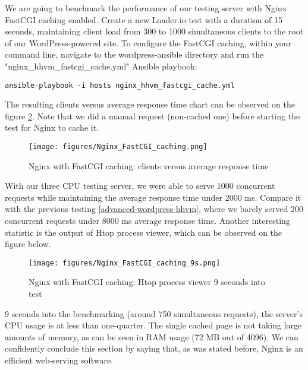We are going to benchmark the performance of our testing server with Nginx FastCGI caching enabled. Create a new Loader.io test with a duration of 15 seconds, maintaining client load from 300 to 1000 simultaneous clients to the root of our WordPress-powered site. \cite{Loader.io:nginx_hhvm_fastcgi_caching} To configure the FastCGI caching, within your command line, navigate to the wordpress-ansible directory and run the "nginx\_hhvm\_fastcgi\_cache.yml" Ansible playbook:

\begin{lstlisting}
ansible-playbook -i hosts nginx_hhvm_fastcgi_cache.yml
\end{lstlisting}

The resulting clients versus average response time chart can be observed on the figure \ref{fig:nginx_fastcgi_caching}. Note that we did a manual request (non-cached one) before starting the test for Nginx to cache it.

\begin{figure}[H]
\begin{center}
\texttt{[image: figures/Nginx\_FastCGI\_caching.png]}
\caption{Nginx with FastCGI caching: clients versus average response time}
\label{fig:nginx_fastcgi_caching}
\end{center}
\end{figure}

With our three CPU testing server, we were able to serve 1000 concurrent requests while maintaining the average response time under 2000 ms. Compare it with the previous testing \ref{advanced-wordpress-hhvm}, where we barely served 200 concurrent requests under 8000 ms average response time. Another interesting statistic is the output of Htop process viewer, which can be observed on the figure below.

\begin{figure}[H]
\begin{center}
\texttt{[image: figures/Nginx\_FastCGI\_caching\_9s.png]}
\caption{Nginx with FastCGI caching: Htop process viewer 9 seconds into test}
\label{fig:nginx_fastcgi_caching}
\end{center}
\end{figure}

9 seconds into the benchmarking (around 750 simultaneous requests), the server's CPU usage is at less than one-quarter. The single cached page is not taking large amounts of memory, as can be seen in RAM usage (72 MB out of 4096). We can confidently conclude this section by saying that, as was stated before, Nginx is an efficient web-serving software.

